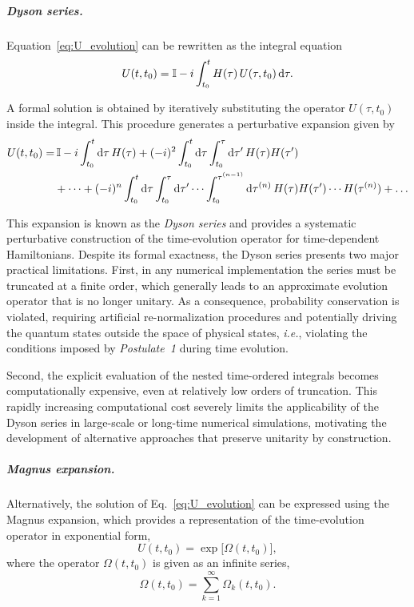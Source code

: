 \subparagraph{Dyson series.}
Equation~\eqref{eq:U_evolution} can be rewritten as the integral equation
\begin{equation}
    U(t,t_0) = \mathbb{I} - i \int_{t_0}^{t} H(\tau)\, U(\tau,t_0)\, \mathrm{d}\tau .
\end{equation}

A formal solution is obtained by iteratively substituting the operator $U(\tau,t_0)$ inside the integral. This procedure generates a perturbative expansion given by
\begin{align}
    \label{eq:dyson_series}
    U(t,t_0) = & \, \mathbb{I}
    - i \int_{t_0}^{t} \mathrm{d}\tau\, H(\tau)
    + (-i)^2 \int_{t_0}^{t} \mathrm{d}\tau \int_{t_0}^{\tau} \mathrm{d}\tau'\, H(\tau) H(\tau') \nonumber \\
               & + \dots
    + (-i)^n \int_{t_0}^{t} \mathrm{d}\tau \int_{t_0}^{\tau} \mathrm{d}\tau' \cdots
    \int_{t_0}^{\tau^{(n-1)}} \mathrm{d}\tau^{(n)}\,
    H(\tau) H(\tau') \cdots H(\tau^{(n)})
    + \dots
\end{align}

This expansion is known as the \textit{Dyson series} and provides a systematic perturbative construction of the time-evolution operator for time-dependent Hamiltonians. Despite its formal exactness, the Dyson series presents two major practical limitations. First, in any numerical implementation the series must be truncated at a finite order, which generally leads to an approximate evolution operator that is no longer unitary. As a consequence, probability conservation is violated, requiring artificial re-normalization procedures and potentially driving the quantum states outside the space of physical states, \textit{i.e.}, violating the conditions imposed by \textit{Postulate~1} during time evolution.

Second, the explicit evaluation of the nested time-ordered integrals becomes computationally expensive, even at relatively low orders of truncation. This rapidly increasing computational cost severely limits the applicability of the Dyson series in large-scale or long-time numerical simulations, motivating the development of alternative approaches that preserve unitarity by construction.

\subparagraph{Magnus expansion.}
Alternatively, the solution of Eq.~\eqref{eq:U_evolution} can be expressed using the Magnus expansion, which provides a representation of the time-evolution operator in exponential form,
\begin{equation}
    U(t,t_0) = \exp\!\big[\Omega(t,t_0)\big],
    \label{eq:magnus}
\end{equation}
where the operator $\Omega(t,t_0)$ is given as an infinite series,
\begin{equation}
    \Omega(t,t_0) = \sum_{k=1}^{\infty} \Omega_k(t,t_0).
\end{equation}

